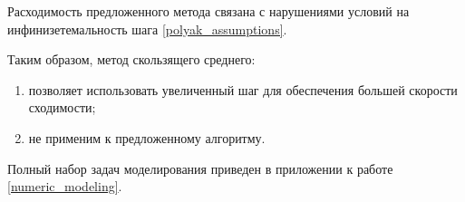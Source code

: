 Расходимость предложенного метода связана с нарушениями условий на инфинизетемальность шага \ref{polyak_assumptions}.

Таким образом, метод скользящего среднего:
\begin{enumerate}
    \item позволяет использовать увеличенный шаг для обеспечения большей скорости сходимости;
    \item не применим к предложенному алгоритму.
\end{enumerate}

Полный набор задач моделирования приведен в приложении к работе \ref{numeric_modeling}.